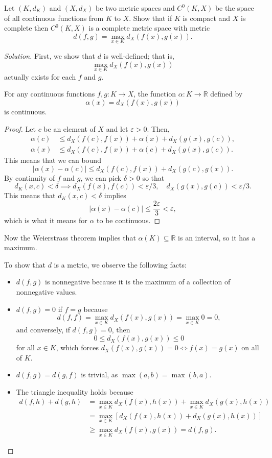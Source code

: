 \documentclass[11pt]{scrartcl}
\providecommand{\eps}{\varepsilon}
\providecommand{\RR}{\mathbb R}
\providecommand{\ii}{\item}
\newenvironment{soln}{\begin{proof}[Solution]}{\end{proof}}
\begin{document}
\begin{problem}
	Let $(K, d_K)$ and $(X, d_X)$ be two metric spaces
	and $C^0(K, X)$ be the space of all continuous functions from $K$ to $X$.
	Show that if $K$ is compact and $X$ is complete then
	$C^0(K, X)$ is a complete metric space with metric
	\[d(f, g) = \max_{x\in K} d_X(f(x), g(x)).\]
\end{problem}

\begin{soln}
	First, we show that $d$ is well-defined; that is,
	\[\max_{x\in K} d_X(f(x), g(x))\]
	actually exists for each $f$ and $g$.
	
	\begin{claim}
		For any continuous functions $f,g\colon K\to X$,
		the function $\alpha\colon K\to\RR$ defined by
		\[\alpha(x) = d_X(f(x), g(x))\]
		is continuous.
	\end{claim}
	\begin{proof}
		Let $c$ be an element of $X$ and let $\eps > 0$. Then,
		\begin{align*}
			\alpha(c) &\le d_X(f(c), f(x)) +
			\alpha(x) + d_X(g(x), g(c)),\\
			\alpha(x) &\le d_X(f(c), f(x)) +
			\alpha(c) + d_X(g(x), g(c)).
		\end{align*}
		This means that we can bound
		\[|\alpha(x) - \alpha(c)| \le d_X(f(c), f(x)) + d_X(g(c), g(x)).\]
		By continuity of $f$ and $g$, we can pick $\delta> 0$ so that
		\[d_K(x, c) < \delta \implies
		d_X(f(x), f(c)) < \eps/3,\quad d_X(g(x), g(c)) < \eps/3.\]
		This means that $d_K(x, c) < \delta$ implies
		\[|\alpha(x) - \alpha(c)| \le \frac{2\eps}3 < \eps,\]
		which is what it means for $\alpha$ to be continuous.
	\end{proof}
	
	Now the Weierstrass theorem implies that $\alpha(K)\subseteq\RR$
	is an interval, so it has a maximum.
	
	To show that $d$ is a metric, we observe the following facts:
	\begin{itemize}
		\ii $d(f, g)$ is nonnegative because it is the maximum
		of a collection of nonnegative values.
		\ii $d(f, g) = 0$ if $f = g$ because
		\[d(f, f) = \max_{x\in K} d_X(f(x), g(x)) =
		\max_{x\in K} 0 = 0,\]
		and conversely, if $d(f, g) = 0$, then
		\[0 \le d_X(f(x), g(x)) \le 0\]
		for all $x\in K$, which forces $d_X(f(x), g(x)) = 0 \iff f(x) = g(x)$
		on all of $K$.
		\ii $d(f, g) = d(g, f)$ is trivial, as $\max(a, b) = \max(b, a)$.
		\ii The triangle inequality holds because
		\begin{align*}
			d(f, h) + d(g, h) &=
			\max_{x\in K} d_X(f(x), h(x)) + \max_{x\in K} d_X(g(x), h(x))\\
			&= \max_{x\in K} [d_X(f(x), h(x)) + d_X(g(x), h(x))]\\
			&\ge \max_{x\in K} d_X(f(x), g(x)) = d(f, g).
		\end{align*}
	\end{itemize}
	

\end{soln}
\end{document}
